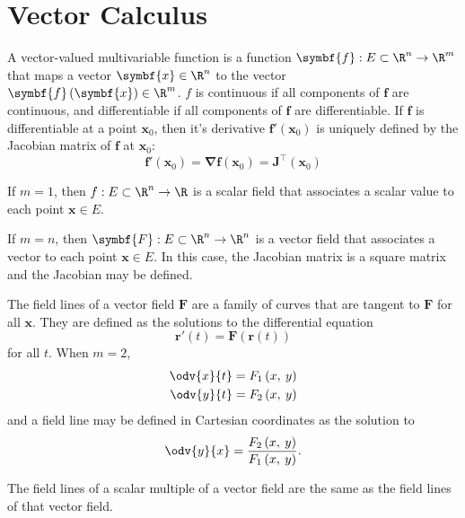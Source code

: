 \documentclass{article}
\begin{document}
\section{Vector Calculus}
A vector-valued multivariable function is a function \(\symbf{f} : E
\subset \R^n \to \R^m\) that maps a vector \(\symbf{x} \in \R^n\) to
the vector \(\symbf{f}\left( \symbf{x} \right) \in \R^m\). \(f\) is
continuous if all components of \(\symbf{f}\) are continuous, and
differentiable if all components of \(\symbf{f}\) are differentiable.
If \(\symbf{f}\) is differentiable at a point \(\symbf{x}_0\), then
it's derivative \(\symbf{f}'\left( \symbf{x}_0 \right)\) is uniquely
defined by the Jacobian matrix of \(\symbf{f}\) at \(\symbf{x}_0\):
\begin{equation*}
    \symbf{f}'\left( \symbf{x}_0 \right) = \symbf{\nabla} \symbf{f}\left( \symbf{x}_0 \right) = \symbf{J}^\top \left( \symbf{x}_0 \right)
\end{equation*}
\begin{definition}
    If \(m = 1\), then \(f : E \subset \R^n \to \R\) is a scalar field
    that associates a scalar value to each point \(\symbf{x} \in E\).
\end{definition}
\begin{definition}
    If \(m = n\), then \(\symbf{F} : E \subset \R^n \to \R^n\) is a
    vector field that associates a vector to each point \(\symbf{x} \in E\).
    In this case, the Jacobian matrix is a square matrix and the
    Jacobian may be defined.
\end{definition}
\begin{definition}
    The field lines of a vector field \(\symbf{F}\) are a family of
    curves that are tangent to \(\symbf{F}\) for all \(\symbf{x}\). They
    are defined as the solutions to the differential equation
    \begin{equation*}
        \symbf{r}'\left( t \right) = \symbf{F}\left( \symbf{r}\left( t \right) \right)
    \end{equation*}
    for all \(t\). When \(m = 2\),
    \begin{align*}
        \odv{x}{t} & = F_1\left( x,\: y \right) \\
        \odv{y}{t} & = F_2\left( x,\: y \right)
    \end{align*}
    and a field line may be defined in Cartesian coordinates as the
    solution to
    \begin{equation*}
        \odv{y}{x} = \frac{F_2\left( x,\: y \right)}{F_1\left( x,\: y \right)}.
    \end{equation*}
\end{definition}
\begin{lemma}
    The field lines of a scalar multiple of a vector field are the same
    as the field lines of that vector field.
\end{lemma}
\end{document}
